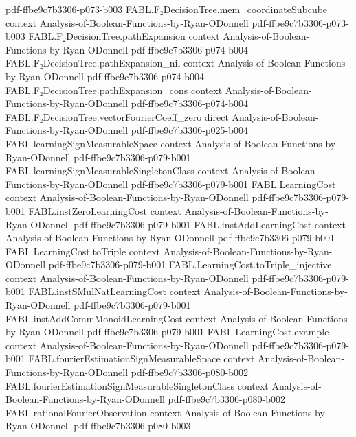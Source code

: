 \begin{theorem}
  {pdf-ffbe9c7b3306-p073-b003}
\proofstep
  {FABL.F₂DecisionTree.mem_coordinateSubcube}
  {context}
  {Analysis-of-Boolean-Functions-by-Ryan-ODonnell}
  {pdf-ffbe9c7b3306-p073-b003}
\proofstep
  {FABL.F₂DecisionTree.pathExpansion}
  {context}
  {Analysis-of-Boolean-Functions-by-Ryan-ODonnell}
  {pdf-ffbe9c7b3306-p074-b004}
\proofstep
  {FABL.F₂DecisionTree.pathExpansion_nil}
  {context}
  {Analysis-of-Boolean-Functions-by-Ryan-ODonnell}
  {pdf-ffbe9c7b3306-p074-b004}
\proofstep
  {FABL.F₂DecisionTree.pathExpansion_cons}
  {context}
  {Analysis-of-Boolean-Functions-by-Ryan-ODonnell}
  {pdf-ffbe9c7b3306-p074-b004}
\proofstep
  {FABL.F₂DecisionTree.vectorFourierCoeff_zero}
  {direct}
  {Analysis-of-Boolean-Functions-by-Ryan-ODonnell}
  {pdf-ffbe9c7b3306-p025-b004}
\proofstep
  {FABL.learningSignMeasurableSpace}
  {context}
  {Analysis-of-Boolean-Functions-by-Ryan-ODonnell}
  {pdf-ffbe9c7b3306-p079-b001}
\proofstep
  {FABL.learningSignMeasurableSingletonClass}
  {context}
  {Analysis-of-Boolean-Functions-by-Ryan-ODonnell}
  {pdf-ffbe9c7b3306-p079-b001}
\proofstep
  {FABL.LearningCost}
  {context}
  {Analysis-of-Boolean-Functions-by-Ryan-ODonnell}
  {pdf-ffbe9c7b3306-p079-b001}
\proofstep
  {FABL.instZeroLearningCost}
  {context}
  {Analysis-of-Boolean-Functions-by-Ryan-ODonnell}
  {pdf-ffbe9c7b3306-p079-b001}
\proofstep
  {FABL.instAddLearningCost}
  {context}
  {Analysis-of-Boolean-Functions-by-Ryan-ODonnell}
  {pdf-ffbe9c7b3306-p079-b001}
\proofstep
  {FABL.LearningCost.toTriple}
  {context}
  {Analysis-of-Boolean-Functions-by-Ryan-ODonnell}
  {pdf-ffbe9c7b3306-p079-b001}
\proofstep
  {FABL.LearningCost.toTriple_injective}
  {context}
  {Analysis-of-Boolean-Functions-by-Ryan-ODonnell}
  {pdf-ffbe9c7b3306-p079-b001}
\proofstep
  {FABL.instSMulNatLearningCost}
  {context}
  {Analysis-of-Boolean-Functions-by-Ryan-ODonnell}
  {pdf-ffbe9c7b3306-p079-b001}
\proofstep
  {FABL.instAddCommMonoidLearningCost}
  {context}
  {Analysis-of-Boolean-Functions-by-Ryan-ODonnell}
  {pdf-ffbe9c7b3306-p079-b001}
\proofstep
  {FABL.LearningCost.example}
  {context}
  {Analysis-of-Boolean-Functions-by-Ryan-ODonnell}
  {pdf-ffbe9c7b3306-p079-b001}
\proofstep
  {FABL.fourierEstimationSignMeasurableSpace}
  {context}
  {Analysis-of-Boolean-Functions-by-Ryan-ODonnell}
  {pdf-ffbe9c7b3306-p080-b002}
\proofstep
  {FABL.fourierEstimationSignMeasurableSingletonClass}
  {context}
  {Analysis-of-Boolean-Functions-by-Ryan-ODonnell}
  {pdf-ffbe9c7b3306-p080-b002}
\proofstep
  {FABL.rationalFourierObservation}
  {context}
  {Analysis-of-Boolean-Functions-by-Ryan-ODonnell}
  {pdf-ffbe9c7b3306-p080-b003}

\end{theorem}

